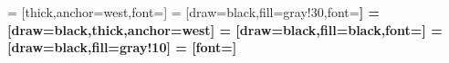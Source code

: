 \usepackage{booktabs}
\usepackage{tabularx}
\usepackage{float} %
\usepackage{array}
\usepackage{ragged2e} %



\usepackage{tikz}													%
\usetikzlibrary{trees}												%

  =   [thick,anchor=west,font=\ttfamily]
        =   [draw=black,fill=gray!30,font=\ttfamily\bfseries]
      =   [draw=black,thick,anchor=west]
    =   [draw=black,fill=black,font=\color{white}]
  =   [draw=black,fill=gray!10]
     =   [font=\color{gray}]



\usepackage{shellesc}												%
\usepackage{tcolorbox}												%
\usepackage{fontawesome}											%
\usepackage{minted}													%



\usepackage{comment}												%
\ifdraft
	\usepackage{todonotes}                                          %
\else
	\usepackage[disable]{todonotes}                                 %
\fi
